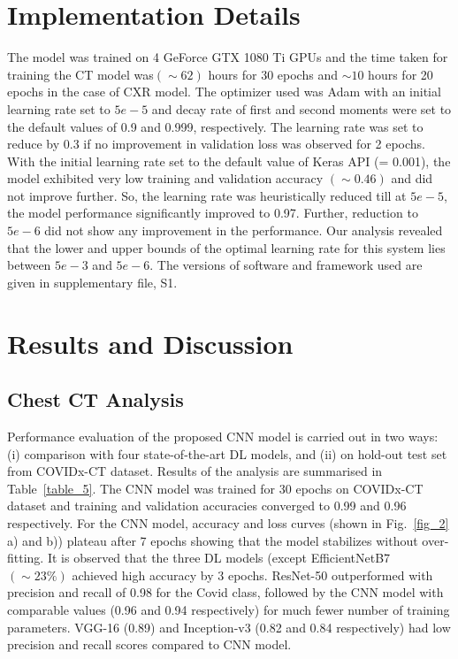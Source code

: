 \documentclass[10pt,journal,compsoc]{IEEEtran}
\begin{document}
\section{Implementation Details}
The model was trained on 4 GeForce GTX 1080 Ti GPUs and the time taken for training the CT model was\((\sim62)\) hours for 30 epochs and \(\sim10\) hours for 20 epochs in the case of CXR model. The optimizer used was Adam with an initial learning rate set to \(5e-5\) and decay rate of first and second moments were set to the default values of 0.9 and 0.999, respectively. The learning rate was set to reduce by 0.3 if no improvement in validation loss was observed for 2 epochs. With the initial learning rate set to the default value of Keras API (= 0.001), the model exhibited very low training and validation accuracy \((\sim0.46)\) and did not improve further. So, the learning rate was heuristically reduced till at \(5e-5\), the model performance significantly improved to 0.97. Further, reduction to \(5e-6\) did not show any improvement in the performance. Our analysis revealed that the lower and upper bounds of the optimal learning rate for this system lies between \(5e-3\) and \(5e-6\). The versions of software and framework used are given in supplementary file, S1.


\section{Results and Discussion}
\subsection{Chest CT Analysis}
Performance evaluation of the proposed CNN model is carried out in two ways: (i) comparison with four state-of-the-art DL models, and (ii) on hold-out test set from COVIDx-CT dataset. Results of the analysis are summarised in Table~\ref{table_5}. The CNN model was trained for 30 epochs on COVIDx-CT dataset and training and validation accuracies converged to 0.99 and 0.96 respectively. For the CNN model, accuracy and loss curves (shown in Fig.~\ref{fig_2} a) and b)) plateau after 7 epochs showing that the model stabilizes without over-fitting. It is observed that the three DL models (except EfficientNetB7 
\((\sim23\%)\) achieved high accuracy by 3 epochs. ResNet-50 outperformed with precision and recall of 0.98 for the Covid class, followed by the CNN model with comparable values (0.96 and 0.94 respectively) for much fewer number of training parameters. VGG-16 (0.89) and Inception-v3 (0.82 and 0.84 respectively) had low precision and recall scores compared to CNN model.
\end{document}

